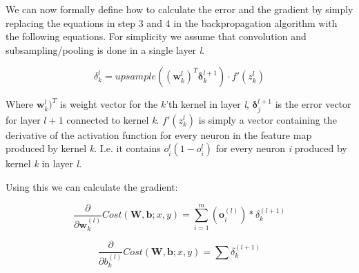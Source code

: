 We can now formally define how to calculate the error and the gradient by simply replacing the equations in step 3 and 4 in the backpropagation algorithm with the following equations. For simplicity we assume that convolution and subsampling/pooling is done in a single layer \textit{l}.




\begin{equation}
	\delta_{k}^{l} =  upsample( (\mathbf{w}_{k}^l)^T \mathbf{\delta}_{k}^{l+1})\cdot f'(z_k^l)
\end{equation}

Where $  \mathbf{w}_{k}^l)^T $ is weight vector for the $ k $'th kernel in layer \textit{l}, $  \mathbf{\delta}_{j}^{l+1} $ is the error vector for layer $ l + 1 $ connected to kernel \textit{k}. $ f'(z_k^l) $ is simply a vector containing the derivative of the activation function for every neuron in the feature map produced by kernel \textit{k}. I.e. it contains $ o_{i}^l(1-o_{i}^l) $ for every neuron \textit{i} produced by kernel \textit{k} in layer \textit{l}. 

Using this we can calculate the gradient:

\begin{equation}
	\frac{\partial}{\partial \mathbf{w}_k^{(l)} }Cost(\mathbf{W,b}; x, y) = \sum_{i=1}^{m}(\mathbf{o}_i^{(l)})*\delta_k^{(l+1)}
\end{equation}

\begin{equation}
	\frac{\partial}{\partial b_k^{(l)} }Cost(\mathbf{W,b}; x, y) = \sum\delta_k^{(l+1)}
\end{equation}












